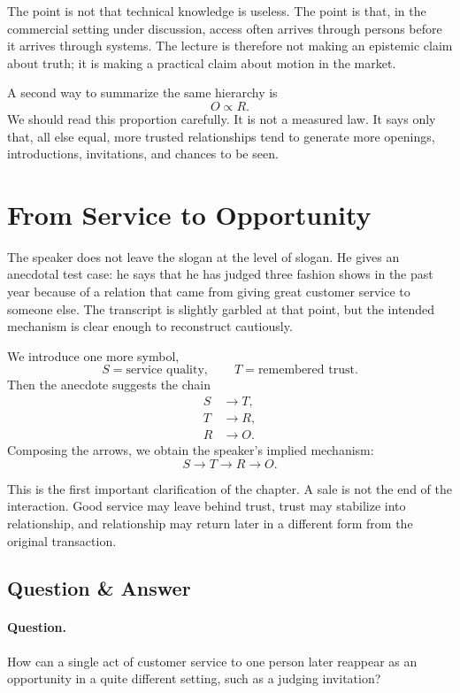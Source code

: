 The point is not that technical knowledge is useless. The point is that, in the commercial setting under discussion, access often arrives through persons before it arrives through systems. The lecture is therefore not making an epistemic claim about truth; it is making a practical claim about motion in the market.

A second way to summarize the same hierarchy is
\begin{equation}
O \propto R.
\end{equation}
We should read this proportion carefully. It is not a measured law. It says only that, all else equal, more trusted relationships tend to generate more openings, introductions, invitations, and chances to be seen.

\section{From Service to Opportunity}

The speaker does not leave the slogan at the level of slogan. He gives an anecdotal test case: he says that he has judged three fashion shows in the past year because of a relation that came from giving great customer service to someone else. The transcript is slightly garbled at that point, but the intended mechanism is clear enough to reconstruct cautiously.

We introduce one more symbol,
\[
S = \text{service quality},
\qquad
T = \text{remembered trust}.
\]
Then the anecdote suggests the chain
\begin{align}
S &\to T,\\
T &\to R,\\
R &\to O.
\end{align}
Composing the arrows, we obtain the speaker's implied mechanism:
\begin{equation}
S \to T \to R \to O.
\end{equation}

This is the first important clarification of the chapter. A sale is not the end of the interaction. Good service may leave behind trust, trust may stabilize into relationship, and relationship may return later in a different form from the original transaction.

\subsection{Question \& Answer}

\paragraph{Question.} How can a single act of customer service to one person later reappear as an opportunity in a quite different setting, such as a judging invitation?

